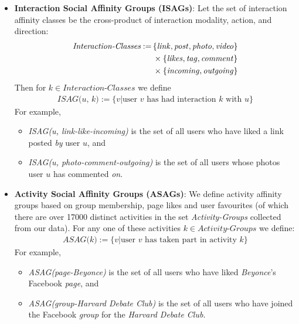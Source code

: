 \begin{itemize}
  \item \textbf{Interaction Social Affinity Groups (ISAGs)}: Let the set of
  interaction affinity classes be the cross-product of interaction
  modality, action, and direction:
  \begin{align*}
  	\textit{Interaction-Classes} := \, & \{\link, \post, \photo, \video\} \\
                                           & \times \{\like, \ttag, \comment\} \\
                                           & \times \{\incoming, \outgoing\}
  \end{align*}
  Then for $k \in \textit{Interaction-Classes}$ we define 
  \begin{align*}
     \textit{ISAG(u, k)} := \{ v | \textrm{user $v$ has had interaction $k$ with $u$} \}
  \end{align*}
  For example,
  \begin{itemize}
     \item \textit{ISAG(u, link-like-incoming)} is the set of all users who
     have liked a link posted \emph{by} user $u$, and 
     \item \textit{ISAG(u, photo-comment-outgoing)} is the set of all users whose photos
     user $u$ has commented \emph{on}.
  \end{itemize}
\item \textbf{Activity Social Affinity Groups (ASAGs)}: We define activity affinity groups based on group membership, page likes and user favourites (of which there are over 17000 distinct activities in the set \textit{Activity-Groups} collected from our data).  For any one
of these activities $k \in \textit{Activity-Groups}$ we define:
  \begin{align*}
     \textit{ASAG(k)} := \{ v | \textrm{user $v$ has taken part in activity $k$} \}
  \end{align*}
  For example,
  \begin{itemize}
     \item \textit{ASAG(page-Beyonce)} is the set of all users who 
     have liked \emph{Beyonce}'s Facebook \emph{page}, and 
     \item \textit{ASAG(group-Harvard Debate Club)} is the set of all users who 
     have joined the Facebook \emph{group} for the \emph{Harvard Debate Club}.
  \end{itemize}
\end{itemize}


